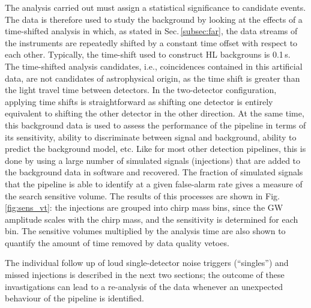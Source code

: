 \documentclass[binding=0.6cm, LaM]{sapthesis}
\begin{document}
	The analysis carried out must assign a statistical significance to candidate events.
        The data is therefore used to study the background by looking at the effects of a time-shifted analysis in which, 
	as stated in Sec.\,\ref{subsec:far}, the data streams of the instruments are repeatedly shifted by a constant time offset with respect to each other. 
	Typically, the time-shift used to construct HL backgrouns is 0.1\,s.
	The time-shifted analysis candidates, i.e., coincidences contained in this artificial data, 
	are not candidates of astrophysical origin, as the time shift is greater than the light travel time between detectors.
	In the two-detector configuration, applying time shifts is straightforward as shifting one detector 
	is entirely equivalent to shifting the other detector in the other direction. 
        At the same time, this background data is used to assess the performance of the pipeline in terms of its sensitivity, 
	ability to discriminate between signal and background, ability to predict the background model, etc. 
	Like for most other detection pipelines, this is done by using a large number of simulated signals (injections) that are added to the background data in software and recovered.
 	The fraction of simulated signals that the pipeline is able to identify at a given false-alarm rate gives a measure of the search sensitive volume.
	The results of this processes are shown in  Fig.\,\ref{fig:sens_vt}: 
	the injections are grouped into chirp mass bins, since the GW amplitude scales with the chirp mass,
	and the sensitivity is determined for each bin.
	The sensitive volumes multiplied by the analysis time are also shown to quantify the amount of time removed by data quality vetoes.

        The individual follow up of loud single-detector noise triggers (``singles'') and missed injections is 
	described in the next two sections; the outcome of these invastigations can lead to a re-analysis of the data whenever an unexpected behaviour of the pipeline is identified. 
\end{document}
